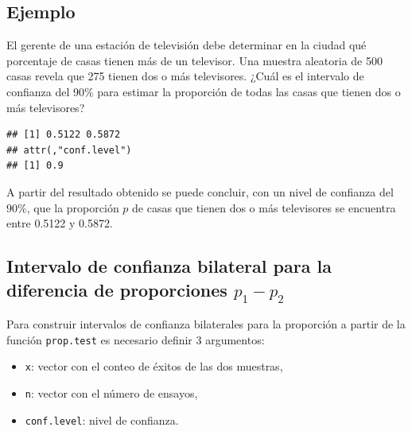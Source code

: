 \documentclass[10pt,]{krantz}
\makeatletter
\newenvironment{Shaded}{\begin{snugshade}}{\end{snugshade}}
\newcommand{\KeywordTok}[1]{\textcolor[rgb]{0.13,0.29,0.53}{\textbf{#1}}}
\newcommand{\DataTypeTok}[1]{\textcolor[rgb]{0.13,0.29,0.53}{#1}}
\newcommand{\DecValTok}[1]{\textcolor[rgb]{0.00,0.00,0.81}{#1}}
\newcommand{\FloatTok}[1]{\textcolor[rgb]{0.00,0.00,0.81}{#1}}
\newcommand{\OperatorTok}[1]{\textcolor[rgb]{0.81,0.36,0.00}{\textbf{#1}}}
\newcommand{\NormalTok}[1]{#1}
\providecommand{\tightlist}{%
  \setlength{\itemsep}{0pt}\setlength{\parskip}{0pt}}
\newenvironment{kframe}{%
\medskip{}
\setlength{\fboxsep}{.8em}
 \def\at@end@of@kframe{}%
 \ifinner\ifhmode%
  \def\at@end@of@kframe{\end{minipage}}%
  \begin{minipage}{\columnwidth}%
 \fi\fi%
 \def\FrameCommand##1{\hskip\@totalleftmargin \hskip-\fboxsep
 \colorbox{shadecolor}{##1}\hskip-\fboxsep
     \hskip-\linewidth \hskip-\@totalleftmargin \hskip\columnwidth}%
 \MakeFramed {\advance\hsize-\width
   \@totalleftmargin\z@ \linewidth\hsize
   \@setminipage}}%
 {\par\unskip\endMakeFramed%
 \at@end@of@kframe}
\renewenvironment{Shaded}{\begin{kframe}}{\end{kframe}}
\makeatother
\begin{document}
\subsection*{Ejemplo}\label{ejemplo-60}


El gerente de una estación de televisión debe determinar en la ciudad
qué porcentaje de casas tienen más de un televisor. Una muestra
aleatoria de 500 casas revela que 275 tienen dos o más televisores.
¿Cuál es el intervalo de confianza del 90\% para estimar la proporción
de todas las casas que tienen dos o más televisores?

\begin{Shaded}
\end{Shaded}

\begin{verbatim}
## [1] 0.5122 0.5872
## attr(,"conf.level")
## [1] 0.9
\end{verbatim}

A partir del resultado obtenido se puede concluir, con un nivel de
confianza del \(90\%\), que la proporción \(p\) de casas que tienen dos
o más televisores se encuentra entre 0.5122 y 0.5872.

\subsection{\texorpdfstring{Intervalo de confianza bilateral para la
diferencia de proporciones
\(p_1 - p_2\)}{Intervalo de confianza bilateral para la diferencia de proporciones p\_1 - p\_2}}\label{intervalo-de-confianza-bilateral-para-la-diferencia-de-proporciones-p_1---p_2}

Para construir intervalos de confianza bilaterales para la proporción a
partir de la función \texttt{prop.test} es necesario definir 3
argumentos:

\begin{itemize}
\tightlist
\item
  \texttt{x}: vector con el conteo de éxitos de las dos muestras,
\item
  \texttt{n}: vector con el número de ensayos,
\item
  \texttt{conf.level}: nivel de confianza.
\end{itemize}
\end{document}
